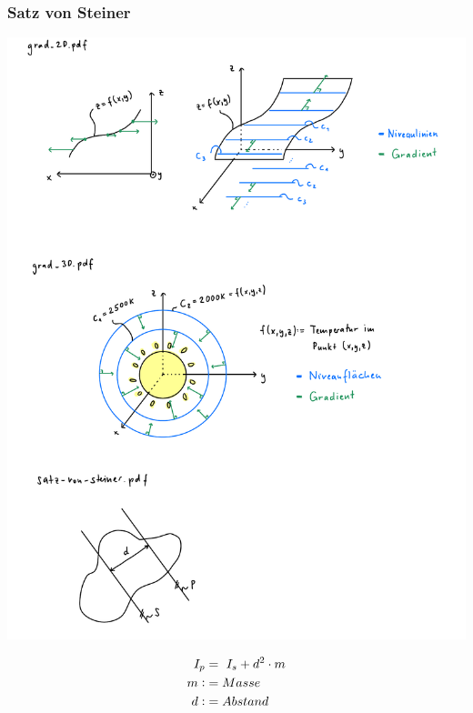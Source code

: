     \subsubsection{Satz von Steiner}
    \begin{minipage}{0.5\linewidth}
        \includegraphics[width=\linewidth]{src/6_Mehrdimensionale-Funktionen_Integralrechnung/satz-von-steiner.pdf}
    \end{minipage}
    \hspace{0.05\linewidth}
    \begin{minipage}{0.4\linewidth}
        \begin{align*}
            I_p &=\,\, I_s + d^2 \cdot m\\
            m \vcentcolon&= Masse\\
            d \vcentcolon&= Abstand\\
        \end{align*}
    \end{minipage}